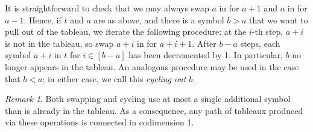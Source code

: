 \documentclass[11pt,reqno]{amsart}
\theoremstyle{definition}
\theoremstyle{problem}
\theoremstyle{plain}
\theoremstyle{remark}
\newtheorem{remark}[definition]{Remark}
\theoremstyle{theorem}
\numberwithin{equation}{section}
\numberwithin{figure}{section}
\begin{document}
It is straightforward to check that we may always swap $a$ in for
$a+1$ and $a$ in for $a-1$.  Hence, if $t$ and $a$ are as above, and
there is a symbol $b > a$ that we want to pull out of the tableau, we
iterate the following procedure: at the $i$-th step, $a+i$ is not in
the tableau, so swap $a+i$ in for $a+i+1$.  After $b-a$ steps, each
symbol $a+i$ in $t$ for $i \in [b-a]$ has been decremented by 1.  In
particular, $b$ no longer appears in the tableau.  An analogous
procedure may be used in the case that $b < a$; in either case, we
call this \textit{cycling out $b$}.

\begin{remark}
Both swapping and  cycling  use at most a single additional symbol than is already in the tableau.  As a consequence,
any path of tableaux produced via these operations is connected in codimension 1.
\end{remark}
\end{document}
